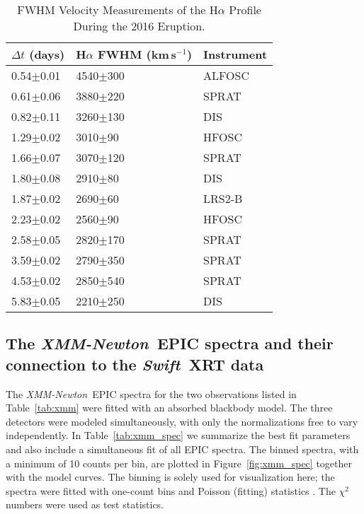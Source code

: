 \documentclass[twocolumn,tighten]{aastex6}
\def\swift{{\it Swift~}}
\def\xmm{{\it XMM-Newton~}}
\begin{document}
\begin{table}
\caption{FWHM Velocity Measurements of the H$\alpha$ Profile During the 2016 Eruption. \label{tab:vel}}
\begin{center}
\begin{tabular}{lll}
\hline
$\Delta t$ (days) &H$\alpha$ FWHM (km\,s$^{-1}$) &Instrument\\
\hline
0.54$\pm$0.01 &4540$\pm$300 &ALFOSC\\
0.61$\pm$0.06 &3880$\pm$220 &SPRAT\\
0.82$\pm$0.11 &3260$\pm$130 &DIS\\
1.29$\pm$0.02 &3010$\pm$90 &HFOSC\\
1.66$\pm$0.07 &3070$\pm$120 &SPRAT\\
1.80$\pm$0.08 &2910$\pm$80 &DIS\\
1.87$\pm$0.02 &2690$\pm$60 &LRS2-B\\
2.23$\pm$0.02 &2560$\pm$90 &HFOSC\\
2.58$\pm$0.05 &2820$\pm$170 &SPRAT\\
3.59$\pm$0.02 &2790$\pm$350 &SPRAT\\
4.53$\pm$0.02 &2850$\pm$540 &SPRAT\\
5.83$\pm$0.05 &2210$\pm$250 &DIS\\
\hline
\end{tabular}
\end{center}
\end{table}

\subsection{The \xmm EPIC spectra and their connection to the \swift XRT data}
\label{sec:xmm_spec}

The \xmm EPIC spectra for the two observations listed in Table~\ref{tab:xmm} were fitted with an absorbed blackbody model. The three detectors were modeled simultaneously, with only the normalizations free to vary independently. In Table~\ref{tab:xmm_spec} we summarize the best fit parameters and also include a simultaneous fit of all EPIC spectra. The binned spectra, with a minimum of 10 counts per bin, are plotted in Figure~\ref{fig:xmm_spec} together with the model curves. The binning is solely used for visualization here; the spectra were fitted with one-count bins and Poisson (fitting) statistics \citep{1979ApJ...228..939C}. The $\chi^2$ numbers were used as test statistics. 
\end{document}
